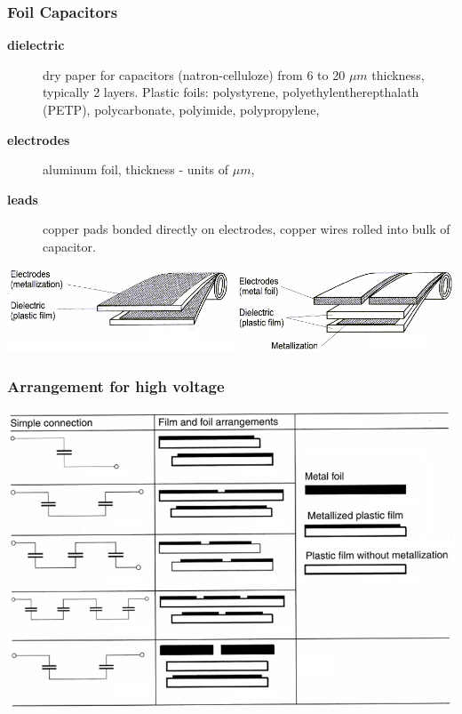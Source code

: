 \documentclass{beamer}
\begin{document}
	\begin{frame}
    \frametitle{Foil Capacitors}
		\small
		\begin{description}
		\item[\textbf{dielectric}] dry paper for capacitors (natron-celluloze) from 6 to 20 $\mu m$ thickness, typically 2 layers. Plastic foils: polystyrene, polyethylentherepthalath (PETP), polycarbonate, polyimide, polypropylene,
		\item[\textbf{electrodes}] aluminum foil, thickness - units of $\mu m$,
		\item[\textbf{leads}] copper pads bonded directly on electrodes, copper wires rolled into bulk of capacitor.
		\end{description}
		\includegraphics[scale=0.4]{obr06_navijeni.png}
  \end{frame}
	\begin{frame}
    \frametitle{Arrangement for high voltage}
		\begin{center}
			\includegraphics[scale=0.45]{obr07_usporadani.png}
		\end{center}
  \end{frame}
\end{document}
